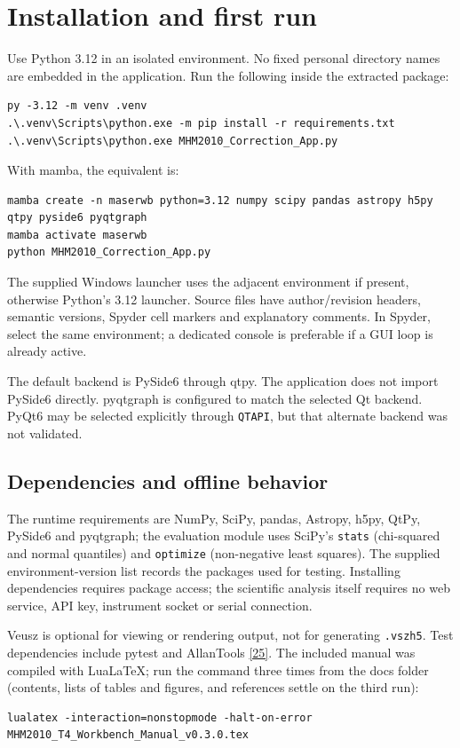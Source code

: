 \documentclass[11pt,a4paper]{article}
\newcommand{\allantools}{\href{https://github.com/aewallin/allantools}{[25]}}
\renewcommand{\_}{\usscore\allowbreak}
\begin{document}
\section{Installation and first run}
Use Python 3.12 in an isolated environment. No fixed personal directory names
are embedded in the application. Run the following inside the extracted package:
\begin{lstlisting}
py -3.12 -m venv .venv
.\.venv\Scripts\python.exe -m pip install -r requirements.txt
.\.venv\Scripts\python.exe MHM2010_Correction_App.py
\end{lstlisting}
With mamba, the equivalent is:
\begin{lstlisting}
mamba create -n maserwb python=3.12 numpy scipy pandas astropy h5py qtpy pyside6 pyqtgraph
mamba activate maserwb
python MHM2010_Correction_App.py
\end{lstlisting}

The supplied Windows launcher uses the adjacent environment if present,
otherwise Python's 3.12 launcher. Source files have author/revision headers,
semantic versions, Spyder cell markers and explanatory comments. In Spyder,
select the same environment; a dedicated console is preferable if a GUI loop
is already active.

The default backend is PySide6 through qtpy. The application does not import
PySide6 directly. pyqtgraph is configured to match the selected Qt backend.
PyQt6 may be selected explicitly through \texttt{QT\_API}, but that alternate
backend was not validated.

\subsection{Dependencies and offline behavior}
The runtime requirements are NumPy, SciPy, pandas, Astropy, h5py, QtPy,
PySide6 and pyqtgraph; the evaluation module uses SciPy's \texttt{stats} (chi-squared and
normal quantiles) and \texttt{optimize} (non-negative least squares). The supplied
environment-version list records the packages used for testing. Installing dependencies
requires package access; the scientific analysis itself requires no web service, API key,
instrument socket or serial connection.

Veusz is optional for viewing or rendering output, not for generating
\texttt{.vszh5}. Test dependencies include pytest and AllanTools \allantools. The included
manual was compiled with LuaLaTeX; run the command three times from the docs folder (contents,
lists of tables and figures, and references settle on the third run):
\begin{lstlisting}
lualatex -interaction=nonstopmode -halt-on-error MHM2010_T4_Workbench_Manual_v0.3.0.tex
\end{lstlisting}
\end{document}
